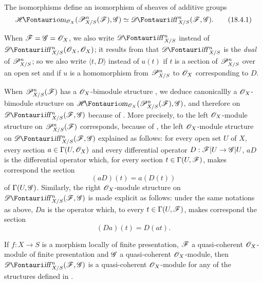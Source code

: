 \begin{proposition}[16.8.4]
\label{IV.16.8.4}
The isomorphisms  define an isomorphism of sheaves of additive groups
\[
  \label{IV.16.8.4.1}
  \shHom_{\sh{O}_X}(\sh{P}_{X/S}^n(\sh{F}), \sh{G}) \isoto \shDiff_{X/S}^n(\sh{F}, \sh{G}).
  \tag{18.4.1}
\]
\end{proposition}

When $\mathscr{F} = \mathscr{G} = \mathscr{O}_X$, we also write $\shDiff_{X/S}^n$ instead of $\shDiff_{X/S}^n(\sh{O}_X, \sh{O}_X)$;
it results from  that $\shDiff_{X/S}^n$ is the \emph{dual} of $\mathscr{P}_{X/S}^n$;
so we also write $\langle t, D \rangle$ instead of $u(t)$ if $t$ is a section of $\mathscr{P}_{X/S}^n$ over an open set and if $u$ is a homomorphism from $\mathscr{P}_{X/S}^n$ to $\mathscr{O}_X$ corresponding to $D$.

\begin{env}[16.8.5]
\label{IV.16.8.5}
When $\mathscr{P}_{X/S}^n(\mathscr{F})$ has a $\mathscr{O}_X$-bimodule structure , we deduce canonicallly a $\mathscr{O}_X$-bimodule structure on $\shHom_{\sh{O}_X}(\sh{P}_{X/S}^n(\sh{F}), \sh{G})$, and therefore on $\shDiff_{X/S}^n(\sh{F}, \sh{G})$ because of .
More precisely, to the left $\mathscr{O}_X$-module structure on $\mathscr{P}_{X/S}^n(\mathscr{F})$ corresponds, because of , the left $\mathscr{O}_X$-module structure on $\shDiff_{X/S}^n(\sh{F}, \sh{G})$ explained as follows:
for every open set $U$ of $X$, every section $a \in \Gamma(U, \mathscr{O}_X)$ and every differential operator $D: \sh{F}|U \to \sh{G}|U$, $aD$ is the differential operator which, for every section $t \in \Gamma(U, \mathscr{F})$, makes correspond the section
\[
  \label{IV.16.8.5.1}
  (aD)(t) = a(D(t))
  \tag{16.8.5.1}
\]
of $\Gamma(U, \mathscr{G})$.
Similarly, the right $\mathscr{O}_X$-module structure on $\shDiff_{X/S}^n(\sh{F}, \sh{G})$ is made explicit as follows:
under the same notations as above, $Da$ is the operator which, to every $t \in \Gamma(U, \mathscr{F})$, makes correspond the section
\[
  \label{IV.16.8.5.2}
  (Da)(t) = D(at).
  \tag{16.8.5.2}
\]
\end{env}

\begin{proposition}[16.8.6]
\label{IV.16.8.6}
If $f:X \to S$ is a morphism locally of finite presentation, $\mathscr{F}$ a quasi-coherent $\mathscr{O}_X$-module of finite presentation and $\mathscr{G}$ a quasi-coherent $\mathscr{O}_X$-module, then $\shDiff_{X/S}^n(\sh{F}, \sh{G})$ is a quasi-coherent $\mathscr{O}_X$-module for any of the structures defined in .
\end{proposition}

